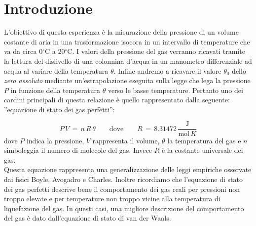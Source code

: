 \section{Introduzione}
L'obiettivo di questa esperienza è la misurazione della pressione di un volume costante di aria in una trasformazione isocora in un intervallo di temperature che va da circa 0$^\circ$C a 20$^\circ$C. I valori della pressione del gas verranno ricavati tramite la lettura del dislivello di una colonnina d'acqua in un manometro differenziale ad acqua al variare della temperatura $\theta$.
Infine andremo a ricavare il valore $\theta_0$ dello \emph{zero assoluto} mediante un'estrapolazione eseguita sulla legge che lega la pressione $P$ in funzione della temperatura $\theta$ verso le basse temperature.
Pertanto uno dei cardini principali di questa relazione è quello rappresentato dalla seguente: ''equazione di stato dei gas perfetti'':

\begin{equation}
	P \, V \,=\, n \, R \, \theta \quad\quad \text{dove} \quad\quad R \,=\, 8.31472 \, \frac{\text{J}}{\text{mol} \, K}
	\label{eq:legge_stato_gas}
\end{equation}
%
dove $P$ indica la pressione, $V$ rappresenta il volume, $\theta$ la temperatura del gas e $n$ simboleggia il numero di molecole del gas. Invece $R$ è la costante universale dei gas.\\

Questa equazione rappresenta una generalizzazione delle leggi empiriche osservate dai fisici Boyle, Avogadro e Charles. Inoltre ricordiamo che l'equazione di stato dei gas perfetti descrive bene il comportamento dei gas reali per pressioni non troppo elevate e per temperature non troppo vicine alla temperatura di liquefazione del gas. In questi casi, una migliore descrizione del comportamento del gas è dato dall'equazione di stato di van der Waals.
